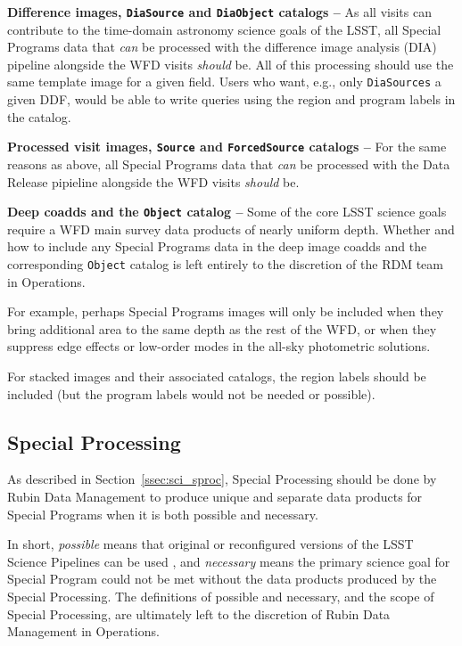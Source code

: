 \textbf{Difference images, {\tt DiaSource} and {\tt DiaObject} catalogs -- }
As all visits can contribute to the time-domain astronomy science goals 
of the LSST, all Special Programs data that {\it can} be processed with 
the difference image analysis (DIA) pipeline alongside the WFD visits 
{\it should} be.
All of this processing should use the same template image for a given
field.
Users who want, e.g., only {\tt DiaSources} a given DDF, would be 
able to write queries using the region and program labels in the catalog.

\textbf{Processed visit images, {\tt Source} and {\tt ForcedSource} catalogs -- }
For the same reasons as above, all Special Programs data that 
{\it can} be processed with the Data Release pipieline alongside the WFD 
visits {\it should} be.

\textbf{Deep coadds and the {\tt Object} catalog -- }
Some of the core LSST science goals require a WFD main survey data 
products of nearly uniform depth.
Whether and how to include any Special Programs data in the deep image 
coadds and the corresponding {\tt Object} catalog is left entirely to the 
discretion of the RDM team in Operations.

For example, perhaps Special Programs images will only be included when 
they bring additional area to the same depth as the rest of the WFD, or 
when they suppress edge effects or low-order modes in the 
all-sky photometric solutions.

For stacked images and their associated catalogs, the region labels should be
included (but the program labels would not be needed or possible).


\subsection{Special Processing}\label{ssec:proc_special}

As described in Section~\ref{ssec:sci_sproc}, 
Special Processing should be done by Rubin Data Management to 
produce unique and separate data products
for Special Programs when it is both possible and necessary.

In short, \emph{possible} means that original or reconfigured versions of the LSST
Science Pipelines can be used , and \emph{necessary} means the primary science goal for Special Program
could not be met without the data products produced by the Special Processing.
The definitions of possible and necessary, and the scope of Special Processing,
are ultimately left to the discretion of Rubin Data Management in Operations.

